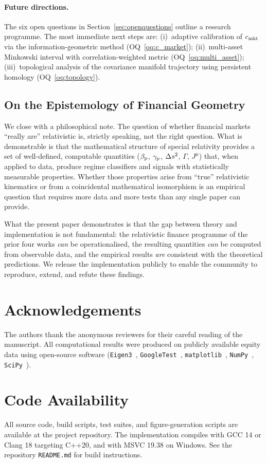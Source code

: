 \paragraph{Future directions.}
The six open questions in Section~\ref{sec:openquestions} outline a research
programme.  The most immediate next steps are: (i)~adaptive calibration of
$c_{\mathrm{mkt}}$ via the information-geometric method (OQ~\ref{oq:c_market});
(ii)~multi-asset Minkowski interval with correlation-weighted metric
(OQ~\ref{oq:multi_asset}); (iii)~topological analysis of the covariance
manifold trajectory using persistent homology (OQ~\ref{oq:topology}).

\subsection{On the Epistemology of Financial Geometry}

We close with a philosophical note.  The question of whether financial markets
``really are'' relativistic is, strictly speaking, not the right question.
What is demonstrable is that the mathematical structure of special relativity
provides a set of well-defined, computable quantities ($\beta_{\mathrm{p}}$, $\gamma_{\mathrm{p}}$,
$\Delta s^2$, $\Gamma$, $J^\mu$) that, when applied to \ohlcv{} data,
produce regime classifiers and signals with statistically measurable properties.
Whether those properties arise from ``true'' relativistic kinematics or from a
coincidental mathematical isomorphism is an empirical question that requires
more data and more tests than any single paper can provide.

What the present paper demonstrates is that the gap between theory and
implementation is not fundamental: the relativistic finance programme of the
prior four works \emph{can} be operationalised, the resulting quantities
\emph{can} be computed from observable data, and the empirical results
\emph{are} consistent with the theoretical predictions.  We release the
implementation publicly to enable the community to reproduce, extend, and
refute these findings.

\section*{Acknowledgements}

The authors thank the anonymous reviewers for their careful reading of the
manuscript.  All computational results were produced on publicly available
equity data using open-source software (\texttt{Eigen3}~\cite{Eigen3},
\texttt{GoogleTest}~\cite{GoogleTest}, \texttt{matplotlib}~\cite{Matplotlib2007},
\texttt{NumPy}~\cite{NumPy2020}, \texttt{SciPy}~\cite{SciPy2020}).

\section*{Code Availability}

All source code, build scripts, test suites, and figure-generation scripts
are available at the project repository.  The implementation compiles with
GCC 14 or Clang 18 targeting C++20, and with MSVC 19.38 on Windows.
See the repository \texttt{README.md} for build instructions.
